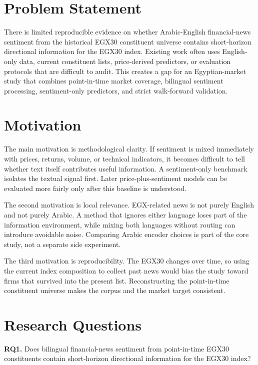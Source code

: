 \section{Problem Statement}

There is limited reproducible evidence on whether Arabic-English financial-news sentiment from the historical EGX30 constituent universe contains short-horizon directional information for the EGX30 index. Existing work often uses English-only data, current constituent lists, price-derived predictors, or evaluation protocols that are difficult to audit. This creates a gap for an Egyptian-market study that combines point-in-time market coverage, bilingual sentiment processing, sentiment-only predictors, and strict walk-forward validation.

\section{Motivation}

The main motivation is methodological clarity. If sentiment is mixed immediately with prices, returns, volume, or technical indicators, it becomes difficult to tell whether text itself contributes useful information. A sentiment-only benchmark isolates the textual signal first. Later price-plus-sentiment models can be evaluated more fairly only after this baseline is understood.

The second motivation is local relevance. EGX-related news is not purely English and not purely Arabic. A method that ignores either language loses part of the information environment, while mixing both languages without routing can introduce avoidable noise. Comparing Arabic encoder choices is part of the core study, not a separate side experiment.

The third motivation is reproducibility. The EGX30 changes over time, so using the current index composition to collect past news would bias the study toward firms that survived into the present list. Reconstructing the point-in-time constituent universe makes the corpus and the market target consistent.

\section{Research Questions}

\noindent\textbf{RQ1.} Does bilingual financial-news sentiment from point-in-time EGX30 constituents contain short-horizon directional information for the EGX30 index?

